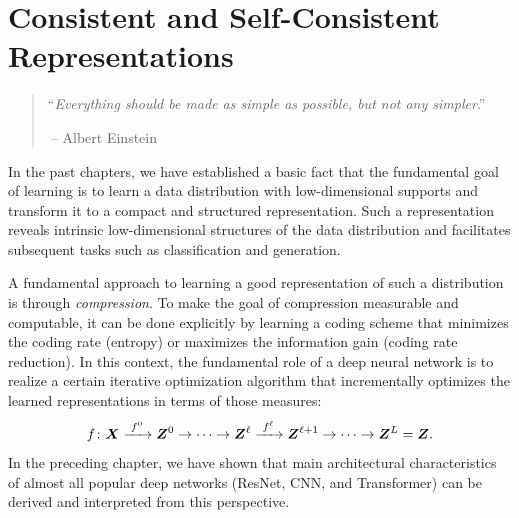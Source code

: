 \documentclass[../../book-main.tex]{subfiles}
\begin{document}
\chapter{Consistent and Self-Consistent Representations}
\label{ch:consistent}\label{ch:autoencoding}
\label{ch:self-consistent}\label{ch:closed-loop}

\begin{quote}
\hfill  ``{\em Everything should be made as simple as possible, but not any simpler}.''

$~$\hfill -- Albert Einstein
\end{quote}



\vspace{5mm}


In the past chapters, we have established a basic fact that the
fundamental goal of learning is to learn a data
distribution with low-dimensional supports and transform it to a compact and structured
representation. Such a representation reveals intrinsic
low-dimensional structures of the data distribution and facilitates
subsequent tasks such as classification and generation.

A fundamental approach to learning a good representation of such a
distribution is through {\em compression}. To make the
goal of compression measurable and computable, it can be done
explicitly by learning a coding scheme that minimizes the coding rate (entropy) or maximizes the information gain (coding rate
reduction). In this context, the fundamental role of a deep neural
network is to realize a certain iterative optimization algorithm that
incrementally optimizes the learned representations in terms of those measures:
\begin{equation}
  f\colon \bm{X}
  \xrightarrow{\hspace{1mm} f^0 \hspace{1mm}} \bm{Z}^0 \rightarrow \cdots
  \rightarrow \bm{Z}^\ell \xrightarrow{\hspace{1mm} f^\ell \hspace{1mm}}
  \bm{Z}^{\ell+1} \rightarrow  \cdots \to \bm{Z}^L = \bm{Z}.
\end{equation}
In the preceding chapter, we have shown that main architectural
characteristics of almost all popular deep networks (ResNet, CNN, and
Transformer) can be derived and interpreted from this perspective.
\end{document}
